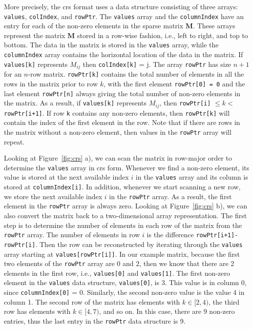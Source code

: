 More precisely, the \gls{crs} format uses a data structure consisting of three arrays: \lstinline{values}, \lstinline{colIndex}, and \lstinline{rowPtr}. The \lstinline{values} array and the \lstinline{columnIndex} have an entry for each of the non-zero elements in the sparse matrix $\mathbf{M}$. These arrays represent the matrix $\mathbf{M}$ stored in a row-wise fashion, i.e., left to right, and top to bottom. The data in the matrix is stored in the \lstinline|values| array, while the \lstinline{columnIndex} array contains the horizontal location of the data in the matrix.  If \lstinline|values[k]| represents $M_{ij}$ then \lstinline|colIndex[k]| = j. The array \lstinline{rowPtr} has size $n+1$ for an $n$-row matrix.  \lstinline|rowPtr[k]| contains the total number of elements in all the rows in the matrix prior to row $k$, with the first element \lstinline|rowPtr[0] = 0| and the last element \lstinline|rowPtr[n]| always giving the total number of non-zero elements in the matrix.  As a result, if \lstinline|values[k]| represents $M_{ij}$, then \lstinline|rowPtr[i]| $\leq k < $\lstinline|rowPtr[i+1]|.  If row \lstinline|k| contains any non-zero elements, then \lstinline|rowPtr[k]| will contain the index of the first element in the row.  Note that if there are rows in the matrix without a non-zero element, then values in the \lstinline|rowPtr| array will repeat.

Looking at Figure~\ref{fig:crs} a), we can scan the matrix in row-major order to determine the \lstinline{values} array in \gls{crs} form.  Whenever we find a non-zero element, its value is stored at the next available index $i$ in the \lstinline|values| array and its column is stored at \lstinline{columnIndex[i]}.  In addition, whenever we start scanning a new row, we store the next available index $i$ in the \lstinline|rowPtr| array.  As a result, the first element in the \lstinline|rowPtr| array is always zero. 
Looking at Figure~\ref{fig:crs} b), we can also convert the matrix back to a two-dimensional array representation.  The first step is to determine the number of elements in each row of the matrix from the \lstinline|rowPtr| array.  The number of elements in row $i$ is the difference \lstinline|rowPtr[i+1]-rowPtr[i]|.   Then the row can be reconstructed by iterating through the \lstinline|values| array starting at \lstinline|values[rowPtr[i]]|. In our example matrix, because the first two elements of the \lstinline|rowPtr| array are $0$ and $2$, then we know that there are 2 elements in the first row, i.e., \lstinline|values[0]| and \lstinline|values[1]|.  The first non-zero element in the \lstinline{values} data structure, \lstinline|values[0]|, is $3$.  This value is in column 0, since \lstinline{columnIndex[0]} = 0. Similarly, the second non-zero value is the value 4 in column 1. The second row of the matrix has elements with $k \in [2,4)$,  the third row has elements with $k \in [4,7)$, and so on.  In this case, there are 9 non-zero entries, thus the last entry in the \lstinline{rowPtr} data structure is 9. 
 
